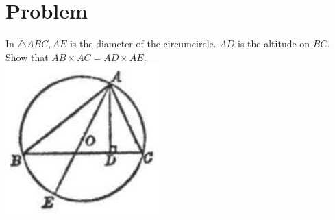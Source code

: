 \documentclass{article}
\begin{document}
\section*{Problem}
In \(\triangle A B C, A E\) is the diameter of the circumcircle. \(A D\) is the altitude on \(B C\). Show that \(A B \times A C=A D \times A E\).\\
\centering
\includegraphics[width=\textwidth]{images/169(1).jpg}
\end{document}

